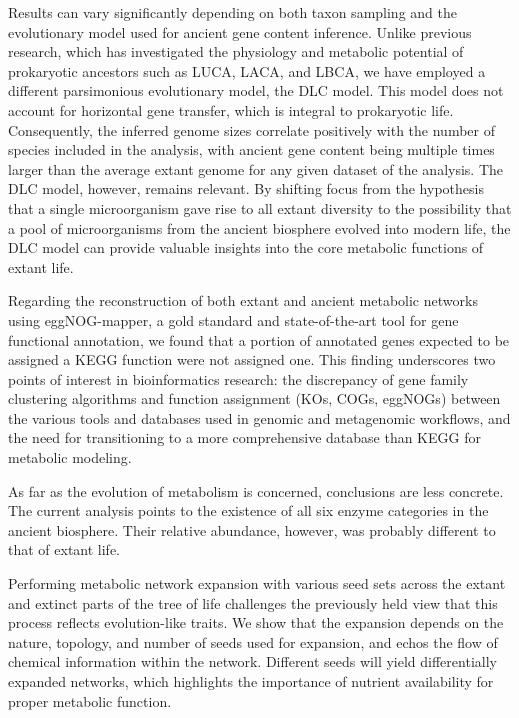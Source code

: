 Results can vary significantly depending on both taxon sampling and the evolutionary model used for ancient gene content inference. Unlike previous research, which has investigated the physiology and metabolic potential of prokaryotic ancestors such as LUCA, LACA, and LBCA, we have employed a different parsimonious evolutionary model, the DLC model. This model does not account for horizontal gene transfer, which is integral to prokaryotic life. Consequently, the inferred genome sizes correlate positively with the number of species included in the analysis, with ancient gene content being multiple times larger than the average extant genome for any given dataset of the analysis. The DLC model, however, remains relevant. By shifting focus from the hypothesis that a single microorganism gave rise to all extant diversity to the possibility that a pool of microorganisms from the ancient biosphere evolved into modern life, the DLC model can provide valuable insights into the core metabolic functions of extant life.

Regarding the reconstruction of both extant and ancient metabolic networks using eggNOG-mapper, a gold standard and state-of-the-art tool for gene functional annotation, we found that a portion of annotated genes expected to be assigned a KEGG function were not assigned one. This finding underscores two points of interest in bioinformatics research: the discrepancy of gene family clustering algorithms and function assignment (KOs, COGs, eggNOGs) between the various tools and databases used in genomic and metagenomic workflows, and the need for transitioning to a more comprehensive database than KEGG for metabolic modeling. 

As far as the evolution of metabolism is concerned, conclusions are less concrete. The current analysis points to the existence of all six enzyme categories in the ancient biosphere. Their relative abundance, however, was probably different to that of extant life.

Performing metabolic network expansion with various seed sets across the extant and extinct parts of the tree of life challenges the previously held view that this process reflects evolution-like traits. We show that the expansion depends on the nature, topology, and number of seeds used for expansion, and echos the flow of chemical information within the network. Different seeds will yield differentially expanded networks, which highlights the importance of nutrient availability for proper metabolic function. 

